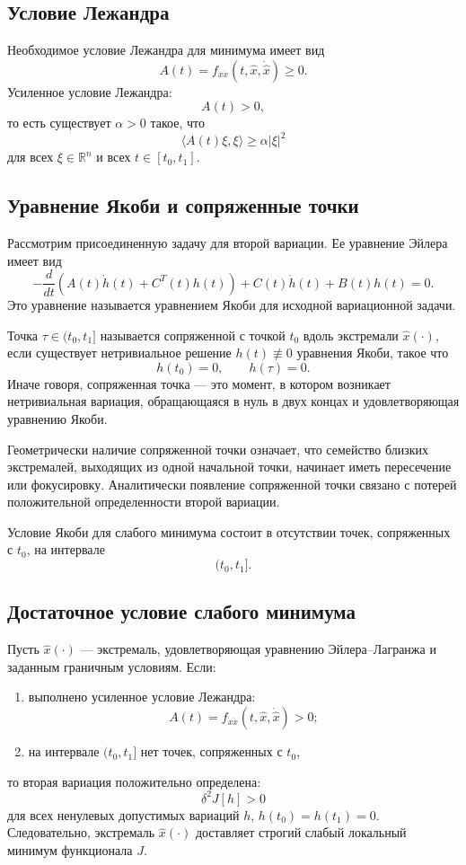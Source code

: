 \documentclass[12pt,a4paper]{article}
\begin{document}
\subsection*{Условие Лежандра}
Необходимое условие Лежандра для минимума имеет вид
\[
A(t)=f_{\dot x\dot x}(t,\widehat x,\dot{\widehat x})\ge0.
\]
Усиленное условие Лежандра:
\[
A(t)>0,
\]
то есть существует $\alpha>0$ такое, что
\[
\langle A(t)\xi,\xi\rangle\ge \alpha|\xi|^2
\]
для всех $\xi\in\mathbb R^n$ и всех $t\in[t_0,t_1]$.

\subsection*{Уравнение Якоби и сопряженные точки}
Рассмотрим присоединенную задачу для второй вариации. Ее уравнение Эйлера имеет вид
\[
-\frac{d}{dt}\left(A(t)\dot h(t)+C^T(t)h(t)\right)
+
C(t)\dot h(t)+B(t)h(t)=0.
\]
Это уравнение называется уравнением Якоби для исходной вариационной задачи.

Точка $\tau\in(t_0,t_1]$ называется сопряженной с точкой $t_0$ вдоль экстремали $\widehat x(\cdot)$, если существует нетривиальное решение $h(t)\not\equiv0$ уравнения Якоби, такое что
\[
h(t_0)=0,\qquad h(\tau)=0.
\]
Иначе говоря, сопряженная точка --- это момент, в котором возникает нетривиальная вариация, обращающаяся в нуль в двух концах и удовлетворяющая уравнению Якоби.

Геометрически наличие сопряженной точки означает, что семейство близких экстремалей, выходящих из одной начальной точки, начинает иметь пересечение или фокусировку. Аналитически появление сопряженной точки связано с потерей положительной определенности второй вариации.

Условие Якоби для слабого минимума состоит в отсутствии точек, сопряженных с $t_0$, на интервале
\[
(t_0,t_1].
\]

\subsection*{Достаточное условие слабого минимума}
Пусть $\widehat x(\cdot)$ --- экстремаль, удовлетворяющая уравнению Эйлера--Лагранжа и заданным граничным условиям. Если:
\begin{enumerate}
    \item выполнено усиленное условие Лежандра:
    \[
    A(t)=f_{\dot x\dot x}(t,\widehat x,\dot{\widehat x})>0;
    \]
    \item на интервале $(t_0,t_1]$ нет точек, сопряженных с $t_0$,
\end{enumerate}
то вторая вариация положительно определена:
\[
\delta^2J[h]>0
\]
для всех ненулевых допустимых вариаций $h$, $h(t_0)=h(t_1)=0$. Следовательно, экстремаль $\widehat x(\cdot)$ доставляет строгий слабый локальный минимум функционала $J$.
\end{document}
